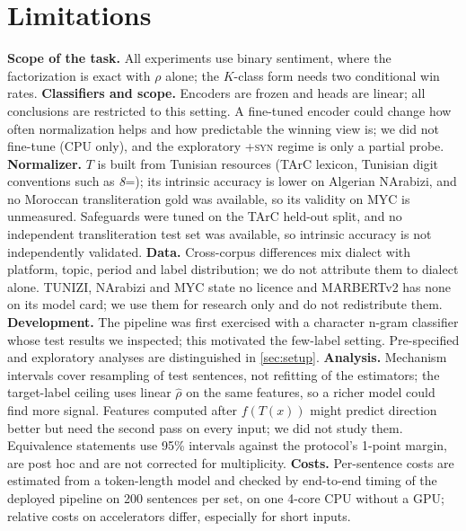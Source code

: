 \section*{Limitations}
\textbf{Scope of the task.} All experiments use binary sentiment, where the factorization is exact with $\rho$ alone; the $K$-class form needs two conditional win rates. \textbf{Classifiers and scope.} Encoders are frozen and heads are linear; all conclusions are restricted to this setting. A fine-tuned encoder could change how often normalization helps and how predictable the winning view is; we did not fine-tune (CPU only), and the exploratory \textsc{+syn} regime is only a partial probe. \textbf{Normalizer.} $T$ is built from Tunisian resources (TArC lexicon, Tunisian digit conventions such as \textit{8}=); its intrinsic accuracy is lower on Algerian NArabizi, and no Moroccan transliteration gold was available, so its validity on MYC is unmeasured. Safeguards were tuned on the TArC held-out split, and no independent transliteration test set was available, so intrinsic accuracy is not independently validated. \textbf{Data.} Cross-corpus differences mix dialect with platform, topic, period and label distribution; we do not attribute them to dialect alone. TUNIZI, NArabizi and MYC state no licence and MARBERTv2 has none on its model card; we use them for research only and do not redistribute them. \textbf{Development.} The pipeline was first exercised with a character n-gram classifier whose test results we inspected; this motivated the few-label setting. Pre-specified and exploratory analyses are distinguished in \cref{sec:setup}. \textbf{Analysis.} Mechanism intervals cover resampling of test sentences, not refitting of the estimators; the target-label ceiling uses linear $\hat\rho$ on the same features, so a richer model could find more signal. Features computed after $f(T(x))$ might predict direction better but need the second pass on every input; we did not study them. Equivalence statements use 95\% intervals against the protocol's 1-point margin, are post hoc and are not corrected for multiplicity. \textbf{Costs.} Per-sentence costs are estimated from a token-length model and checked by end-to-end timing of the deployed pipeline on 200 sentences per set, on one 4-core CPU without a GPU; relative costs on accelerators differ, especially for short inputs.
